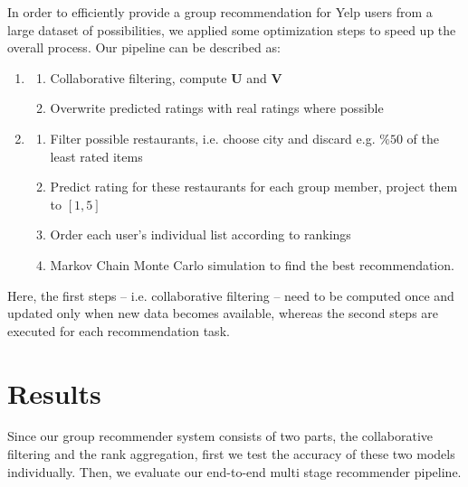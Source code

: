 \documentclass[a4paper]{article}
\begin{document}
In order to efficiently provide a group recommendation for Yelp users from a large dataset of possibilities, we applied some optimization steps to speed up the overall process. Our pipeline can be described as: 
\begin{enumerate}
\item 
\begin{enumerate}
\item Collaborative filtering, compute $\mathbf{U}$ and $\mathbf{V}$
\item Overwrite predicted ratings with real ratings where possible 
\end{enumerate}
\item
\begin{enumerate}
\item Filter possible restaurants, i.e. choose city and discard e.g. $\%50$ of the least rated items
\item Predict rating for these restaurants for each group member, project them to $[1,5]$
\item Order each user's individual list according to rankings
\item Markov Chain Monte Carlo simulation to find the best recommendation.
\end{enumerate}
\end{enumerate}

Here, the first steps -- i.e. collaborative filtering --  need to be computed once and updated only when new data becomes available, whereas the second steps are executed for each recommendation task.

\section{Results}\label{sec:Results}

Since our group recommender system consists of two parts, the collaborative filtering and the rank aggregation, first we test the accuracy of these two models individually. Then, we evaluate our end-to-end multi stage recommender pipeline. 
\end{document}
